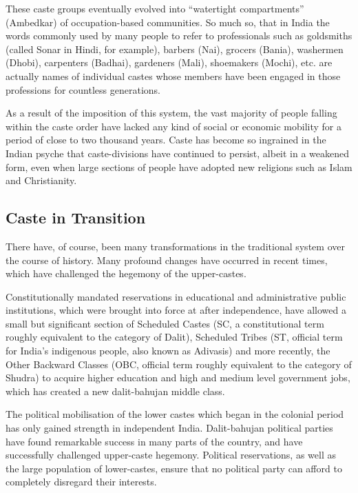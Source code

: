 \documentclass[12pt,a4paper,titlepage]{report}
\begin{document}
These caste groups eventually evolved into ``watertight compartments''
(Ambedkar) of occupation-based communities. So much so, that in India
the words commonly used by many people to refer to professionals such as
goldsmiths (called Sonar in Hindi, for example), barbers (Nai), grocers
(Bania), washermen (Dhobi), carpenters (Badhai), gardeners (Mali),
shoemakers (Mochi), etc. are actually names of individual castes whose
members have been engaged in those professions for countless
generations.

As a result of the imposition of this system, the vast majority of
people falling within the caste order have lacked any kind of social or
economic mobility for a period of close to two thousand years. Caste has
become so ingrained in the Indian psyche that caste-divisions have
continued to persist, albeit in a weakened form, even when large
sections of people have adopted new religions such as Islam and
Christianity.

\subsection{Caste in Transition}\label{caste-in-transition}

There have, of course, been many transformations in the traditional
system over the course of history. Many profound changes have occurred
in recent times, which have challenged the hegemony of the upper-castes.

Constitutionally mandated reservations in educational and administrative
public institutions, which were brought into force at after
independence, have allowed a small but significant section of Scheduled
Castes (SC, a constitutional term roughly equivalent to the category of
Dalit), Scheduled Tribes (ST, official term for India's indigenous
people, also known as Adivasis) and more recently, the Other Backward
Classes (OBC, official term roughly equivalent to the category of
Shudra) to acquire higher education and high and medium level government
jobs, which has created a new dalit-bahujan middle class.

The political mobilisation of the lower castes which began in the
colonial period has only gained strength in independent India.
Dalit-bahujan political parties have found remarkable success in many
parts of the country, and have successfully challenged upper-caste
hegemony. Political reservations, as well as the large population of
lower-castes, ensure that no political party can afford to completely
disregard their interests.
\end{document}
